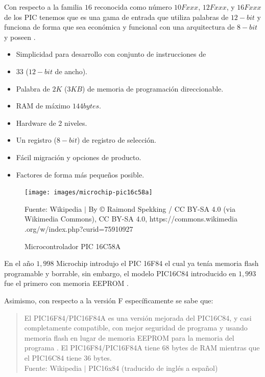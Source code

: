 \documentclass[conference]{IEEEtran}
\begin{document}
    Con respecto a la familia $16$ reconocida como número $10Fxxx$, $12Fxxx$,
    y $16Fxxx$ de los PIC tenemos que es una gama de entrada que utiliza
    palabras de $12-bit$ y funciona de forma que sea económica y funcional
    con una arquitectura de $8-bit$ y poseen
    \cite{microchip-developer-help-2022}.

    \bigbreak

    \begin{itemize}
        \item Simplicidad para desarrollo con conjunto de instrucciones de
        \item $33$ ($12-bit$ de ancho).
        \item Palabra de $2K$ ($3KB$) de memoria de programación direccionable.
        \item RAM de máximo $144bytes$.
        \item Hardware de 2 niveles.
        \item Un registro ($8-bit$) de registro de selección.
        \item Fácil migración y opciones de producto.
        \item Factores de forma más pequeños posible.
    \end{itemize}

    \bigbreak

    \begin{figure}[H]
        \centering
        \texttt{[image: images/microchip-pic16c58a]}
        \caption{Microcontrolador PIC 16C58A} \footnotesize
        Fuente: Wikipedia $\mid$ By © Raimond Spekking / CC BY-SA 4.0 (via
        Wikimedia Commons), CC BY-SA 4.0, https://commons.wikimedia
        .org/w/index.php?curid=75910927 \cite{wikipedia-pic-2022}
    \end{figure}

    \bigbreak

    En el año $1,998$ Microchip introdujo el PIC 16F84 el cual ya tenía
    memoria flash programable y borrable, sin embargo, el modelo PIC16C84
    introducido en $1,993$ fue el primero con memoria EEPROM
    \cite{wikipedia-pic-2022}.

    \bigbreak

    Asimismo, con respecto a la versión F específicamente se sabe que:

    \bigbreak

    \begin{quote}
        El PIC16F84/PIC16F84A es una versión mejorada del PIC16C84, y casi
        completamente compatible, con mejor seguridad de programa y usando
        memoria flash en lugar de memoria EEPROM para la memoria del programa
        . El PIC16F84/PIC16F84A tiene 68 bytes de RAM mientras que el
        PIC16C84 tiene 36 bytes.\\
        \small Fuente: Wikipedia $\mid$ PIC16x84 (traducido de inglés a
        español) \cite{wikipedia-pc16x84-2020}
    \end{quote}
\end{document}
